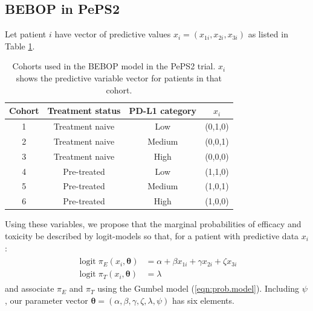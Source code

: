 \documentclass[alpha-refs]{wiley-article}
\DeclareMathOperator{\logit}{logit}
\begin{document}
\subsection{BEBOP in PePS2}
\label{sec:bebop.peps2}
Let patient $i$ have vector of predictive values $x_i = (x_{1i}, x_{2i}, x_{3i})$ as listed in Table \ref{tab:cohorts}.

\begin{table}[p]
	\centering
	\begin{tabular}{|c|c|c|c|}
		\hline Cohort & Treatment status & PD-L1 category & $x_i$ \\ 
		\hline 
		1 & Treatment naive & Low & (0,1,0) \\ 
		2 & Treatment naive & Medium & (0,0,1) \\ 
		3 & Treatment naive & High & (0,0,0) \\ 
		4 & Pre-treated & Low & (1,1,0) \\ 
		5 & Pre-treated & Medium & (1,0,1) \\ 
		6 & Pre-treated & High & (1,0,0) \\ 
		\hline 
	\end{tabular} 
	\caption{Cohorts used in the BEBOP model in the PePS2 trial. $x_i$ shows the predictive variable vector for patients in that cohort.}
	\label{tab:cohorts}
\end{table}

Using these variables, we propose that the marginal probabilities of efficacy and toxicity be described by logit-models so that, for a patient with predictive data $x_i$:
\begin{align}
\label{eqn:logit}
\begin{split}
\logit \pi_E(x_i, \boldsymbol{\theta}) & = \alpha + \beta x_{1i} + \gamma x_{2i} + \zeta x_{3i} \\
\logit \pi_T(x_i, \boldsymbol{\theta}) & = \lambda
\end{split}
\end{align}
and associate $\pi_E$ and $\pi_T$ using the Gumbel model (\ref{eqn:prob.model}).
Including $\psi$, our parameter vector $\boldsymbol{\theta} = (\alpha, \beta, \gamma, \zeta, \lambda, \psi)$ has six elements.
\end{document}
